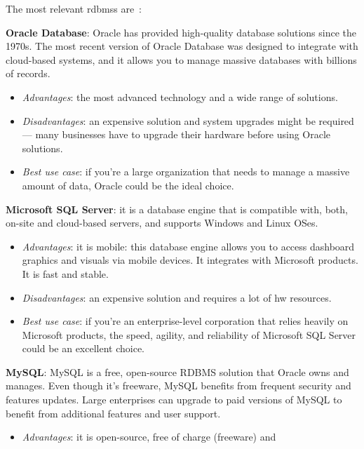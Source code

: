 The most relevant \glspl{rdbms} are~\cite{modernDBChoice}:
\begin{item-c}
\item \textbf{Oracle Database}: 
Oracle has provided high-quality database solutions since the 1970s. The most
recent version of Oracle Database was designed to integrate with cloud-based
systems, and it allows you to manage massive databases with billions of
records.
    \begin{itemize}
    \item \emph{Advantages}: the most advanced technology and a wide range of
    solutions.
    \item \emph{Disadvantages}: an expensive solution and system upgrades might be
    required ---  many businesses have to upgrade their hardware before using Oracle
    solutions.
    \item \emph{Best use case}: if you're a large organization that needs to manage
    a massive amount of data, Oracle could be the ideal choice.
  \end{itemize}
\item \textbf{Microsoft SQL Server}: it is a database engine that is compatible
  with, both, on-site and cloud-based servers, and supports Windows and Linux
  OSes.
    \begin{itemize}
    \item \emph{Advantages}: it is mobile: this database engine allows you to
      access dashboard graphics and visuals via mobile devices. It integrates
      with Microsoft products.  It is fast and stable.
    \item \emph{Disadvantages}: an expensive solution and requires a lot of
      \gls{hw} resources.
    \item \emph{Best use case}: if you're an enterprise-level corporation that
      relies heavily on Microsoft products, the speed, agility, and reliability
      of Microsoft SQL Server could be an excellent choice.
  \end{itemize}
\item \textbf{MySQL}: MySQL is a free, open-source RDBMS solution that Oracle
  owns and manages. Even though it's freeware, MySQL benefits from frequent
  security and features updates. Large enterprises can upgrade to paid versions of MySQL to benefit from additional features and user support.
    \begin{itemize}
    \item \emph{Advantages}: it is open-source, free of charge (freeware) and

\end{itemize}
\end{item-c}
